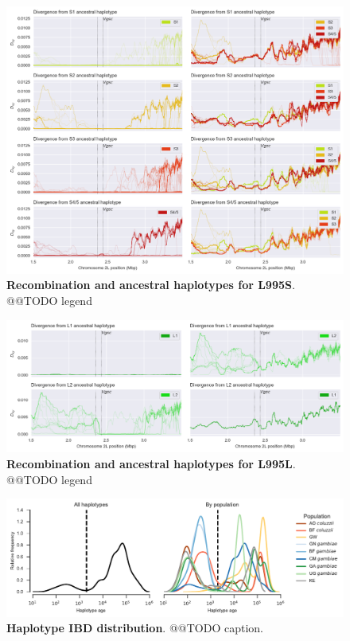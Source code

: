 \documentclass[a4paper,11pt,abstracton,hidelinks]{scrartcl}
\begin{document}
\clearpage

%
\begin{figure}[!t]
  \includegraphics[width=1.1\linewidth,center]{artwork/fig_recom_S.png}
  \caption{\textbf{Recombination and ancestral haplotypes for L995S}. @@TODO legend}
  \label{fig:recom_s}
\end{figure}


\clearpage

%
\begin{figure}[!t]
  \includegraphics[width=1.1\linewidth,center]{artwork/fig_recom_L.png}
  \caption{\textbf{Recombination and ancestral haplotypes for L995L}. @@TODO legend}
  \label{fig:recom_l}
\end{figure}


\clearpage

%
\begin{figure}[!t]
  \includegraphics[width=1.1\linewidth,center]{artwork/haplotype_age_dist.pdf}
  \caption{\textbf{Haplotype IBD distribution}. @@TODO caption.}
  \label{fig:age_hist}
\end{figure}
 
\end{document}

